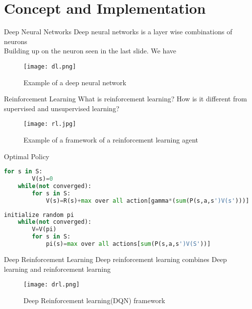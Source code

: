 
\section{Concept and Implementation }
\frame{\sectionpage}

\begin{frame}{Deep Neural Networks}
    Deep neural networks is a layer wise combinations of neurons\\
    Building up on the neuron seen in the last slide. We have
    \begin{figure}
        \centering
        \texttt{[image: dl.png]}\\
        \caption{Example of a deep neural network}
        \label{fig:dl}
    \end{figure}
\end{frame}

\begin{frame}{Reinforcement Learning}
    What is reinforcement learning? How is it different from supervised and unsupervised learning?
    \begin{figure}
        \centering
        \texttt{[image: rl.jpg]}\\
        \caption{Example of a framework of a reinforcement learning agent }
        \label{fig:rl}
    \end{figure}
\end{frame}

\begin{frame}[fragile]{Optimal Policy}
    \begin{lstlisting}[language=python, caption=value iteration algorithm]
    for s in S:
        V(s)=0
    while(not converged):
        for s in S:
            V(s)=R(s)+max over all action[gamma*(sum(P(s,a,s')V(s')))]
    \end{lstlisting}
    
    \begin{lstlisting}[language=python, caption=Policy iteration algorithm]
    initialize random pi
    while(not converged):
        V=V(pi)
        for s in S:
            pi(s)=max over all actions[sum(P(s,a,s')V(S'))]
    \end{lstlisting}
\end{frame}

\begin{frame}{Deep Reinforcement Learning}
    Deep reinforcement learning combines Deep learning and reinforcement learning
    \begin{figure}
        \centering
        \texttt{[image: drl.png]}\\
        \caption{Deep Reinforcement learning(DQN) framework}
        \label{fig:drl}
    \end{figure}
\end{frame}

